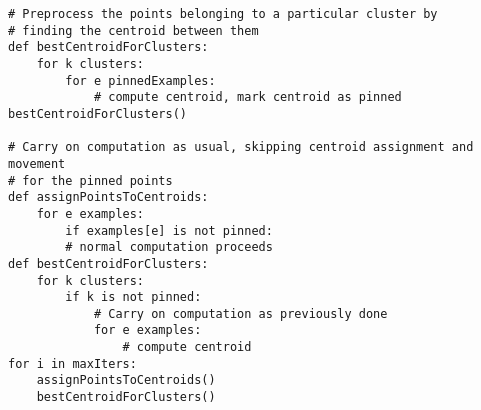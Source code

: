 \documentclass[12pt]{article}
\begin{document}
\begin{enumerate}[label=(\alph*)]
			\begin{verbatim}
# Preprocess the points belonging to a particular cluster by
# finding the centroid between them
def bestCentroidForClusters:
	for k clusters:
		for e pinnedExamples:
			# compute centroid, mark centroid as pinned
bestCentroidForClusters()

# Carry on computation as usual, skipping centroid assignment and movement
# for the pinned points
def assignPointsToCentroids:
	for e examples:
		if examples[e] is not pinned:
		# normal computation proceeds
def bestCentroidForClusters:
	for k clusters:
		if k is not pinned:
			# Carry on computation as previously done
			for e examples:
				# compute centroid
for i in maxIters:
	assignPointsToCentroids()
	bestCentroidForClusters()
			\end{verbatim}
	\end{enumerate}
\end{document}
